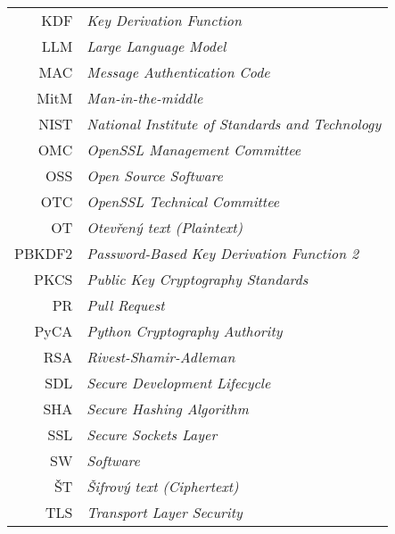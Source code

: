 \documentclass[czech,bachelor,unicode,twoside,hyphens]{ctufit-thesis}
\theoremstyle{plain}
\theoremstyle{definition}
\theoremstyle{remark}
\numberwithin{theorem}{chapter}
\begin{document}
\begin{tabular}{rl}
KDF & \textit{Key Derivation Function} \\
LLM & \textit{Large Language Model} \\
MAC & \textit{Message Authentication Code} \\
MitM & \textit{Man-in-the-middle} \\
NIST & \textit{National Institute of Standards and Technology} \\
OMC & \textit{OpenSSL Management Committee} \\
OSS & \textit{Open Source Software} \\
OTC & \textit{OpenSSL Technical Committee} \\
OT & \textit{Otevřený text (Plaintext)} \\
PBKDF2 & \textit{Password-Based Key Derivation Function 2} \\
PKCS & \textit{Public Key Cryptography Standards} \\
PR & \textit{Pull Request} \\
PyCA & \textit{Python Cryptography Authority} \\
RSA & \textit{Rivest-Shamir-Adleman} \\
SDL & \textit{Secure Development Lifecycle} \\
SHA & \textit{Secure Hashing Algorithm} \\
SSL & \textit{Secure Sockets Layer} \\
SW & \textit{Software} \\
ŠT & \textit{Šifrový text (Ciphertext)} \\
TLS & \textit{Transport Layer Security} \\
\end{tabular}

\mainmatter\mainmatterinit %




\appendix\appendixinit %

\backmatter %

\printbibliography %

\end{document}
